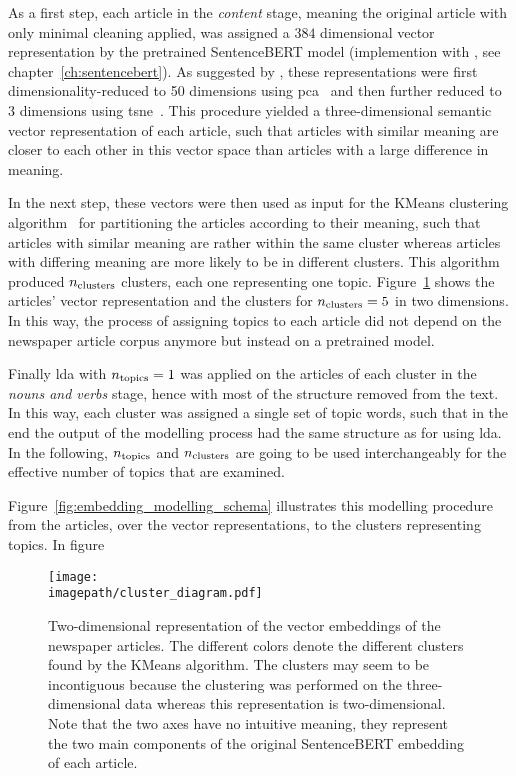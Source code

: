 As a first step, each article in the \textit{content} stage, meaning the original article with only minimal cleaning applied, was assigned a $384$ dimensional vector representation by the pretrained SentenceBERT model (implemention with \textcite{sbertsentencetransformers_sentencetransformers_2022}, see chapter~\ref{ch:sentencebert}). As suggested by \textcite{black_using_2020}, these representations were first dimensionality-reduced to \SI{50}{} dimensions using \gls{pca}~\autocite{pearson_liii_1901} and then further reduced to \SI{3}{} dimensions using \gls{tsne}~\autocite{maaten_visualizing_2008}. This procedure yielded a three-dimensional semantic vector representation of each article, such that articles with similar meaning are closer to each other in this vector space than articles with a large difference in meaning.

In the next step, these vectors were then used as input for the KMeans clustering algorithm~\autocite{macqueen_methods_1967} for partitioning the articles according to their meaning, such that articles with similar meaning are rather within the same cluster whereas articles with differing meaning are more likely to be in different clusters. This algorithm produced $n_\text{clusters}$ clusters, each one representing one topic. Figure~\ref{fig:clusters} shows the articles' vector representation and the clusters for $n_\text{clusters}=5$ in two dimensions. In this way, the process of assigning topics to each article did not depend on the newspaper article corpus anymore but instead on a pretrained model.

Finally \gls{lda} with $n_\text{topics}=1$ was applied on the articles of each cluster in the \textit{nouns and verbs} stage, hence with most of the structure removed from the text. In this way, each cluster was assigned a single set of topic words, such that in the end the output of the modelling process had the same structure as for using \gls{lda}. In the following, $n_\text{topics}$ and $n_\text{clusters}$ are going to be used interchangeably for the effective number of topics that are examined.

Figure~\ref{fig:embedding_modelling_schema} illustrates this modelling procedure from the articles, over the vector representations, to the clusters representing topics. In figure~

\begin{figure}
    \centering
    \texttt{[image: \\imagepath/cluster\_diagram.pdf]}
    \caption{Two-dimensional representation of the vector embeddings of the newspaper articles. The different colors denote the different clusters found by the KMeans algorithm. The clusters may seem to be incontiguous because the clustering was performed on the three-dimensional data whereas this representation is two-dimensional. Note that the two axes have no intuitive meaning, they represent the two main components of the original SentenceBERT embedding of each article.}\label{fig:clusters}
\end{figure}

